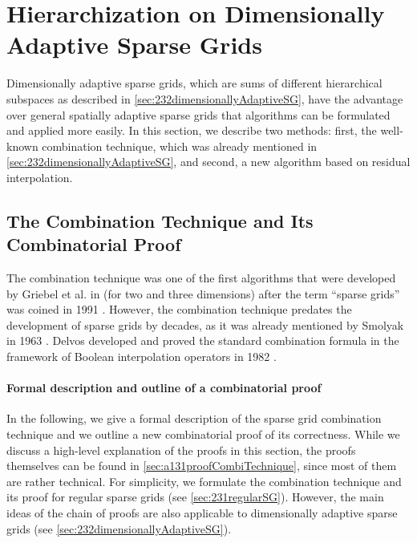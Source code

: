 \section{Hierarchization on Dimensionally Adaptive Sparse Grids}
\label{sec:43dimAdaptive}

Dimensionally adaptive sparse grids,
which are sums of different hierarchical subspaces
as described in \cref{sec:232dimensionallyAdaptiveSG},
have the advantage over general spatially adaptive sparse grids
that algorithms can be formulated and applied more easily.
In this section, we describe two methods:
first, the well-known combination technique, which was
already mentioned in \cref{sec:232dimensionallyAdaptiveSG},
and second, a new algorithm based on residual interpolation.



\subsection{The Combination Technique and Its Combinatorial Proof}
\label{sec:431combiTechniqueProof}



The combination technique was one of the first algorithms that
were developed by Griebel et al. in \cite{Griebel92Combination}
(for two and three dimensions)
after the term ``sparse grids'' was coined in 1991 \cite{Zenger91Sparse}.
However, the combination technique predates the development of sparse grids
by decades, as it was already mentioned by Smolyak in 1963
.
Delvos developed and proved the standard combination formula in the
framework of Boolean interpolation operators in 1982
.

\paragraph{Formal description and outline of a combinatorial proof}

In the following, we give a formal description of the
sparse grid combination technique and we outline a new combinatorial proof
of its correctness.
While we discuss a high-level explanation of the proofs in this section,
the proofs themselves can be found in \cref{sec:a131proofCombiTechnique},
since most of them are rather technical.
For simplicity,
we formulate the combination technique and its proof for regular
sparse grids (see \cref{sec:231regularSG}).
However, the main ideas of the chain of proofs are also applicable
to dimensionally adaptive sparse grids
(see \cref{sec:232dimensionallyAdaptiveSG}).

